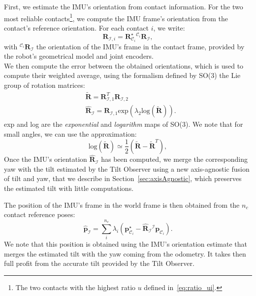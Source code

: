 \documentclass{IJCAS}
\begin{document}
First, we estimate the IMU's orientation from contact information. For the two most reliable contacts\footnote{The two contacts with the highest ratio $u$ defined in~\eqref{eq:ratio_ui}.}, we compute the IMU frame's orientation from the contact's reference orientation. For each contact $i$, we write:
\begin{equation}
    \boldsymbol{R}_{\mathcal{I}, i} = \boldsymbol{R}^{\star}_{\mathcal{C}_{i}} {}^{\mathcal{C}_{i}} \boldsymbol{R}_{\mathcal{I}}, \label{eq:R_I_i}
\end{equation}
with ${}^{\mathcal{C}_{i}} \boldsymbol{R}_{\mathcal{I}}$ the orientation of the IMU's frame in the contact frame, provided by the robot's geometrical model and joint encoders.\\
We then compute the error between the obtained orientations, which is used to compute their weighted average, using the formalism defined by SO(3) the Lie group of rotation matrices:
\begin{align}
    &\tilde{\boldsymbol{R}} = \boldsymbol{R}^{T}_{\mathcal{I}, 1} \boldsymbol{R}_{\mathcal{I}, 2}  \\
 & \hat{\boldsymbol{R}}_{\mathcal{I}} = \boldsymbol{R}_{\mathcal{I}, 1} \text{exp} \left( \lambda_{2}\text{log} \left( \tilde{\boldsymbol{R}}\right)  \right). \label{eq:leg_odom_avg_ori}
\end{align}
exp and log are the \emph{exponential} and \emph{logarithm} maps of SO(3). We note that for small angles, we can use the approximation:
\begin{equation}
\text{log}\left(\tilde{\boldsymbol{R}}\right) \simeq \frac{1}{2} \left(\tilde{\boldsymbol{R}}-\tilde{\boldsymbol{R}}^{T}\right), \label{eq:log_small}
\end{equation}
Once the IMU's orientation $\hat{\boldsymbol{R}}_{\mathcal{I}}$ has been computed, we merge the corresponding yaw with the tilt estimated by the Tilt Observer using a new axis-agnostic fusion of tilt and yaw, that we describe in Section~\ref{sec:axisAgnostic}, which preserves the estimated tilt with little computations.

The position of the IMU's frame in the world frame is then obtained from the $n_{c}$ contact reference poses: 
\begin{equation}
    \hat{\boldsymbol{p}}_{\mathcal{I}} = \sum^{n_{c}}_{i} \lambda_{i} \left( \boldsymbol{p}^{\star}_{{\mathcal{C}}_{i}} - \hat{\boldsymbol{R}}_{\mathcal{I}} {}^{\mathcal{I}}\boldsymbol{p}_{{\mathcal{C}}_{i}} \right). \label{eq:est_p_imu}
\end{equation}
We note that this position is obtained using the IMU's orientation estimate that merges the estimated tilt with the yaw coming from the odometry. It takes then full profit from the accurate tilt provided by the Tilt Observer.
\end{document}
